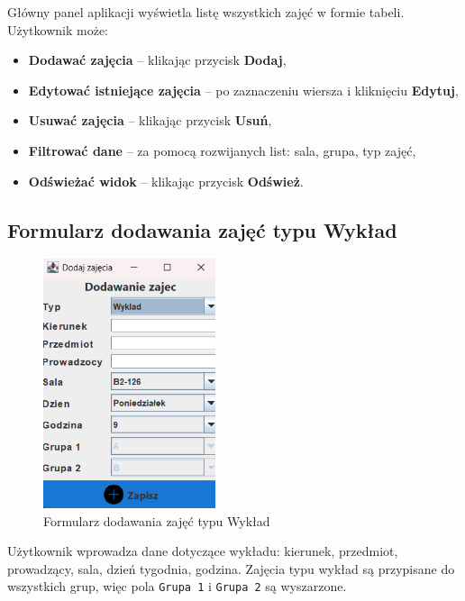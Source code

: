 Główny panel aplikacji wyświetla listę wszystkich zajęć w formie tabeli. Użytkownik może:
\begin{itemize}
    \item \textbf{Dodawać zajęcia} – klikając przycisk \textbf{Dodaj},
    \item \textbf{Edytować istniejące zajęcia} – po zaznaczeniu wiersza i kliknięciu \textbf{Edytuj},
    \item \textbf{Usuwać zajęcia} – klikając przycisk \textbf{Usuń},
    \item \textbf{Filtrować dane} – za pomocą rozwijanych list: sala, grupa, typ zajęć,
    \item \textbf{Odświeżać widok} – klikając przycisk \textbf{Odśwież}.
\end{itemize}

\subsection*{Formularz dodawania zajęć typu Wykład}
\begin{figure}[H]
\centering
\includegraphics[width=0.45\textwidth]{figures/workApl/add_wyklad_panel.png}
\caption{Formularz dodawania zajęć typu Wykład}
\label{fig:add_wyklad}
\end{figure}

Użytkownik wprowadza dane dotyczące wykładu: kierunek, przedmiot, prowadzący, sala, dzień tygodnia, godzina. Zajęcia typu wykład są przypisane do wszystkich grup, więc pola \texttt{Grupa 1} i \texttt{Grupa 2} są wyszarzone.

